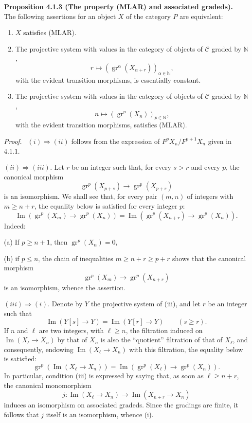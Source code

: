 \documentclass[11pt]{article}
\providecommand{\NN}{\mathbb{N}}
\newenvironment{statement}[1]{\par\medskip\noindent\textbf{#1.}\ }{\par\medskip}
\newenvironment{prooftext}[1][Proof]{\par\noindent\emph{#1.}\ }{\par\medskip}
\providecommand{\gr}{\operatorname{gr}}
\providecommand{\NN}{\mathbb N}
\providecommand{\cC}{\mathcal C}
\providecommand{\Im}{\operatorname{Im}}
\providecommand{\gr}{\operatorname{gr}}
\renewcommand{\Im}{\operatorname{Im}}
\providecommand{\gr}{\operatorname{gr}}
\providecommand{\Im}{\operatorname{Im}}
\providecommand{\cC}{\mathcal C}
\begin{document}
\begin{statement}{Proposition 4.1.3 (The property (MLAR) and associated gradeds)}
The following assertions for an object $X$ of the category $P$ are equivalent:
\begin{enumerate}[label=(\roman*)]
\item $X$ satisfies (MLAR).
\item The projective system with values in the category of objects of $\cC$ graded by $\NN$,
\[
r\longmapsto (\gr^\alpha(X_{\alpha+r}))_{\alpha\in\NN},
\]
with the evident transition morphisms, is essentially constant.
\item The projective system with values in the category of objects of $\cC$ graded by $\NN$,
\[
n\longmapsto (\gr^p(X_n))_{p\in\NN},
\]
with the evident transition morphisms, satisfies (MLAR).
\end{enumerate}
\end{statement}

\begin{prooftext}[Proof]
$(i)\Rightarrow(ii)$ follows from the expression of $F^pX_n/F^{p+1}X_n$ given in 4.1.1.

$(ii)\Rightarrow(iii)$. Let $r$ be an integer such that, for every $s>r$ and every $p$, the canonical morphism
\[
\gr^p(X_{p+s})\longrightarrow \gr^p(X_{p+r})
\]
is an isomorphism. We shall see that, for every pair $(m,n)$ of integers with $m\ge n+r$, the equality below is satisfied for every integer $p$:
\[
\Im(\gr^p(X_m)\to\gr^p(X_n))=
\Im(\gr^p(X_{n+r})\to\gr^p(X_n)).
\]
Indeed:

(a) If $p\ge n+1$, then $\gr^p(X_n)=0$,

(b) if $p\le n$, the chain of inequalities $m\ge n+r\ge p+r$ shows that the canonical morphism
\[
\gr^p(X_m)\longrightarrow\gr^p(X_{n+r})
\]
is an isomorphism, whence the assertion.

$(iii)\Rightarrow(i)$. Denote by $Y$ the projective system of (iii), and let $r$ be an integer such that
\[
\Im(Y[s]\to Y)=\Im(Y[r]\to Y)\qquad(s\ge r).
\]
If $n$ and $\ell$ are two integers, with $\ell\ge n$, the filtration induced on $\Im(X_\ell\to X_n)$ by that of $X_n$ is also the ``quotient'' filtration of that of $X_\ell$, and consequently, endowing $\Im(X_\ell\to X_n)$ with this filtration, the equality below is satisfied:
\[
\gr^p(\Im(X_\ell\to X_n))=
\Im(\gr^p(X_\ell)\to\gr^p(X_n)).
\]
In particular, condition (iii) is expressed by saying that, as soon as $\ell\ge n+r$, the canonical monomorphism
\[
j:\Im(X_\ell\to X_n)\longrightarrow\Im(X_{n+r}\to X_n)
\]
induces an isomorphism on associated gradeds. Since the gradings are finite, it follows that $j$ itself is an isomorphism, whence (i).
\end{prooftext}
\end{document}
